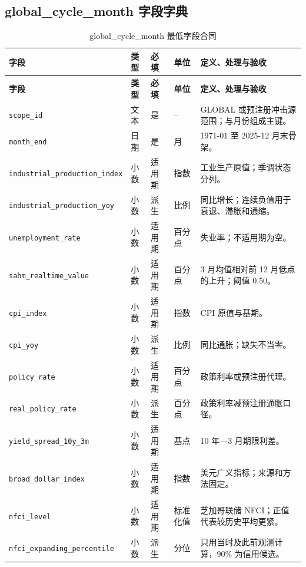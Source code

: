 \documentclass[UTF8,fontset=windows,12pt,openany]{ctexbook}
\newcommand{\Field}[1]{{\small\nolinkurl{#1}}}
\begin{document}
\clearpage
\begin{landscape}
\chapter{global\_cycle\_month 字段字典}

\begin{longtable}{p{4.0cm}p{2.0cm}p{2.2cm}p{2.8cm}p{7.3cm}}
\caption{global\_cycle\_month 最低字段合同}\label{tab:dict-global-cycle}\\
\toprule
\textbf{字段} & \textbf{类型} & \textbf{必填} & \textbf{单位} & \textbf{定义、处理与验收}\\
\midrule
\endfirsthead
\toprule \textbf{字段} & \textbf{类型} & \textbf{必填} & \textbf{单位} & \textbf{定义、处理与验收}\\ \midrule
\endhead
\Field{scope_id} & 文本 & 是 & -- & GLOBAL 或预注册冲击源范围；与月份组成主键。\\
\Field{month_end} & 日期 & 是 & 月 & 1971-01 至 2025-12 月末骨架。\\
\Field{industrial_production_index} & 小数 & 适用期 & 指数 & 工业生产原值；季调状态分列。\\
\Field{industrial_production_yoy} & 小数 & 派生 & 比例 & 同比增长；连续负值用于衰退、滞胀和通缩。\\
\Field{unemployment_rate} & 小数 & 适用期 & 百分点 & 失业率；不适用期为空。\\
\Field{sahm_realtime_value} & 小数 & 适用期 & 百分点 & 3 月均值相对前 12 月低点的上升；阈值 0.50\cite{sahmfred}。\\
\Field{cpi_index} & 小数 & 适用期 & 指数 & CPI 原值与基期。\\
\Field{cpi_yoy} & 小数 & 派生 & 比例 & 同比通胀；缺失不当零。\\
\Field{policy_rate} & 小数 & 适用期 & 百分点 & 政策利率或预注册代理。\\
\Field{real_policy_rate} & 小数 & 派生 & 百分点 & 政策利率减预注册通胀口径。\\
\Field{yield_spread_10y_3m} & 小数 & 适用期 & 基点 & 10 年—3 月期限利差。\\
\Field{broad_dollar_index} & 小数 & 适用期 & 指数 & 美元广义指标；来源和方法固定。\\
\Field{nfci_level} & 小数 & 适用期 & 标准化值 & 芝加哥联储 NFCI；正值代表较历史平均更紧\cite{nfciofficial,nfcifred}。\\
\Field{nfci_expanding_percentile} & 小数 & 派生 & 分位 & 只用当时及此前观测计算，90\% 为信用候选。\\

\end{longtable}
\end{landscape}
\end{document}
